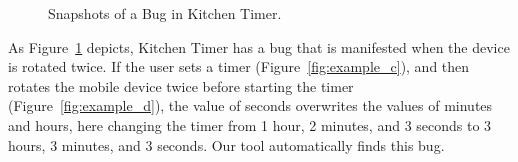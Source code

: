 \begin{figure}[!t]
\centering
{}
\hfil
{}
\caption{Snapshots of a Bug in Kitchen Timer.}
\label{fig:example}
\end{figure}


As Figure~\ref{fig:example} depicts, Kitchen Timer has a bug that is manifested when the device is rotated twice. If the user sets a timer (Figure~\ref{fig:example_c}), and then rotates the mobile device twice before starting the timer (Figure~\ref{fig:example_d}), the value of seconds overwrites the values of minutes and hours, here changing the timer from 1 hour, 2 minutes, and 3 seconds to 3 hours, 3 minutes, and 3 seconds.
Our tool automatically finds this bug. %



